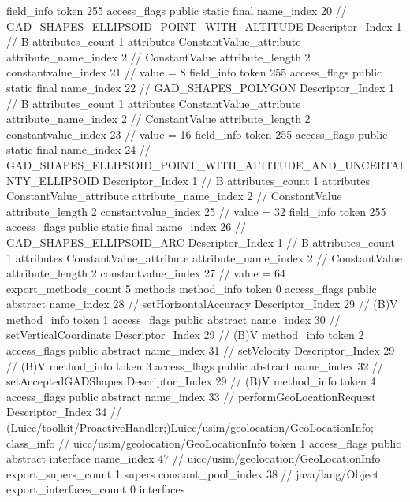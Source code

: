 {{{{{{{				}
				}
			}
			field_info {
				token	255
				access_flags	public static final
				name_index	20		// GAD_SHAPES_ELLIPSOID_POINT_WITH_ALTITUDE
				Descriptor_Index	1		// B
				attributes_count	1
				attributes {
				ConstantValue_attribute {
					attribute_name_index	2		// ConstantValue
					attribute_length	2
					constantvalue_index	21		// value = 8
				}
				}
			}
			field_info {
				token	255
				access_flags	public static final
				name_index	22		// GAD_SHAPES_POLYGON
				Descriptor_Index	1		// B
				attributes_count	1
				attributes {
				ConstantValue_attribute {
					attribute_name_index	2		// ConstantValue
					attribute_length	2
					constantvalue_index	23		// value = 16
				}
				}
			}
			field_info {
				token	255
				access_flags	public static final
				name_index	24		// GAD_SHAPES_ELLIPSOID_POINT_WITH_ALTITUDE_AND_UNCERTAINTY_ELLIPSOID
				Descriptor_Index	1		// B
				attributes_count	1
				attributes {
				ConstantValue_attribute {
					attribute_name_index	2		// ConstantValue
					attribute_length	2
					constantvalue_index	25		// value = 32
				}
				}
			}
			field_info {
				token	255
				access_flags	public static final
				name_index	26		// GAD_SHAPES_ELLIPSOID_ARC
				Descriptor_Index	1		// B
				attributes_count	1
				attributes {
				ConstantValue_attribute {
					attribute_name_index	2		// ConstantValue
					attribute_length	2
					constantvalue_index	27		// value = 64
				}
				}
			}
			}
			export_methods_count	5
			methods {
				method_info {
					token	0
					access_flags	public abstract
					name_index	28		// setHorizontalAccuracy
					Descriptor_Index	29		// (B)V
				}
				method_info {
					token	1
					access_flags	public abstract
					name_index	30		// setVerticalCoordinate
					Descriptor_Index	29		// (B)V
				}
				method_info {
					token	2
					access_flags	public abstract
					name_index	31		// setVelocity
					Descriptor_Index	29		// (B)V
				}
				method_info {
					token	3
					access_flags	public abstract
					name_index	32		// setAcceptedGADShapes
					Descriptor_Index	29		// (B)V
				}
				method_info {
					token	4
					access_flags	public abstract
					name_index	33		// performGeoLocationRequest
					Descriptor_Index	34		// (Luicc/toolkit/ProactiveHandler;)Luicc/usim/geolocation/GeoLocationInfo;
				}
			}
		}
		class_info {		// uicc/usim/geolocation/GeoLocationInfo
			token	1
			access_flags	public abstract interface
			name_index	47		// uicc/usim/geolocation/GeoLocationInfo
			export_supers_count	1
			supers {
				constant_pool_index	38		// java/lang/Object
			}
			export_interfaces_count	0
			interfaces {
}}}}
